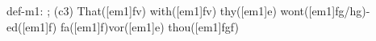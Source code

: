def-m1: \grealign;
(c3) That([em1]fv) with([em1]fv) thy([em1]e) wont([em1]fg/hg)-ed([em1]f) fa([em1]f)vor([em1]e) thou([em1]fgf)